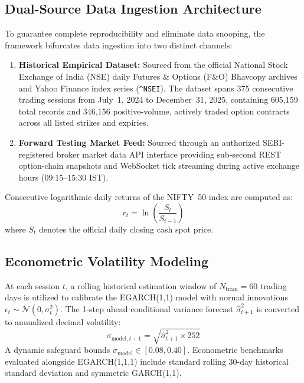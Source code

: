 \documentclass[journal]{IEEEtran}
\begin{document}
\subsection{Dual-Source Data Ingestion Architecture}
To guarantee complete reproducibility and eliminate data snooping, the framework bifurcates data ingestion into two distinct channels:
\begin{enumerate}
    \item \textbf{Historical Empirical Dataset:} Sourced from the official National Stock Exchange of India (NSE) daily Futures \& Options (F\&O) Bhavcopy archives and Yahoo Finance index series (\texttt{\string^NSEI}). The dataset spans 375 consecutive trading sessions from July~1, 2024 to December~31, 2025, containing 605{,}159 total records and 346{,}156 positive-volume, actively traded option contracts across all listed strikes and expiries.
    \item \textbf{Forward Testing Market Feed:} Sourced through an authorized SEBI-registered broker market data API interface providing sub-second REST option-chain snapshots and WebSocket tick streaming during active exchange hours (09:15--15:30 IST).
\end{enumerate}

Consecutive logarithmic daily returns of the NIFTY~50 index are computed as:
\begin{equation}
r_t = \ln\left(\frac{S_t}{S_{t-1}}\right)
\end{equation}
where $S_t$ denotes the official daily closing cash spot price.

\subsection{Econometric Volatility Modeling}
At each session $t$, a rolling historical estimation window of $N_{\mathrm{train}}=60$ trading days is utilized to calibrate the EGARCH(1,1) model with normal innovations $\epsilon_t \sim \mathcal{N}(0, \sigma_t^2)$. The 1-step ahead conditional variance forecast $\hat{\sigma}_{t+1}^2$ is converted to annualized decimal volatility:
\begin{equation}
\sigma_{\mathrm{model},t+1} = \sqrt{\hat{\sigma}_{t+1}^2 \times 252}
\end{equation}
A dynamic safeguard bounds $\sigma_{\mathrm{model}} \in [0.08, 0.40]$. Econometric benchmarks evaluated alongside EGARCH(1,1,1) include standard rolling 30-day historical standard deviation and symmetric GARCH(1,1).
\end{document}
